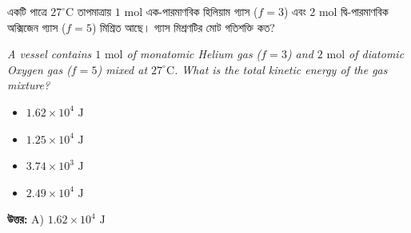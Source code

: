 \documentclass[12pt, a4paper]{article}
\begin{document}
\vspace{2em}

\begin{tcolorbox}[questionbox={প্রশ্ন (Question) 8}]
    \noindent
    একটি পাত্রে $27^\circ\text{C}$ তাপমাত্রায় $1\text{ mol}$ এক-পারমাণবিক হিলিয়াম গ্যাস ($f = 3$) এবং $2\text{ mol}$ দ্বি-পারমাণবিক অক্সিজেন গ্যাস ($f = 5$) মিশ্রিত আছে। গ্যাস মিশ্রণটির মোট গতিশক্তি কত?
    
    \vspace{0.8em}
    \begin{english}
    \noindent\textit{\color{darkgray}
    A vessel contains $1\text{ mol}$ of monatomic Helium gas ($f = 3$) and $2\text{ mol}$ of diatomic Oxygen gas ($f = 5$) mixed at $27^\circ\text{C}$. What is the total kinetic energy of the gas mixture?
    }
    \end{english}
\end{tcolorbox}

\begin{itemize}[label={}, leftmargin=1cm, itemsep=0.5em]
    \item[\textbf{A)}] $1.62 \times 10^4\text{ J}$
    \item[\textbf{B)}] $1.25 \times 10^4\text{ J}$
    \item[\textbf{C)}] $3.74 \times 10^3\text{ J}$
    \item[\textbf{D)}] $2.49 \times 10^4\text{ J}$
\end{itemize}

\vspace{0.5em}
\begin{tcolorbox}[answerbox]
    \textbf{\color{success} উত্তর:} A) $1.62 \times 10^4\text{ J}$
\end{tcolorbox}
\vspace{1em}
\end{document}
